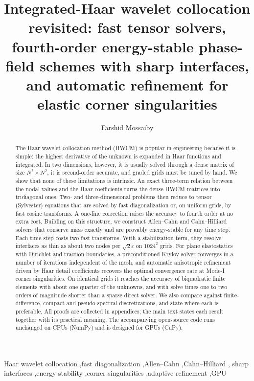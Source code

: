 \documentclass[preprint,12pt]{elsarticle}
\theoremstyle{remark}
\begin{document}
\begin{frontmatter}
\title{Integrated-Haar wavelet collocation revisited: fast tensor solvers, fourth-order
energy-stable phase-field schemes with sharp interfaces, and automatic refinement for elastic corner singularities}

\author[inst1]{Farshid Mossaiby}

\begin{abstract}
The Haar wavelet collocation method (HWCM) is popular in engineering because it is simple: the
highest derivative of the unknown is expanded in Haar functions and integrated. In two dimensions,
however, it is usually solved through a dense matrix of size $N^2\times N^2$, it is second-order
accurate, and graded grids must be tuned by hand. We show that none of these limitations is
intrinsic. An exact three-term relation between the nodal values and the Haar coefficients turns
the dense HWCM matrices into tridiagonal ones. Two- and three-dimensional problems then reduce to
tensor (Sylvester) equations that are solved by fast diagonalization or, on uniform grids, by fast
cosine transforms. A one-line correction raises the accuracy to fourth order at no extra cost.
Building on this structure, we construct Allen--Cahn and Cahn--Hilliard solvers that conserve mass
exactly and are provably energy-stable for any time step. Each time step costs two fast transforms.
With a stabilization term, they resolve interfaces as thin as about two nodes per
$\sqrt2\varepsilon$ on $1024^2$ grids. For plane elastostatics with Dirichlet and traction
boundaries, a preconditioned Krylov solver converges in a number of iterations independent of the
mesh, and automatic anisotropic refinement driven by Haar detail coefficients recovers the optimal
convergence rate at Mode-I corner singularities. On identical grids it reaches the accuracy of
biquadratic finite elements with about one quarter of the unknowns, and with solve times one to two
orders of magnitude shorter than a sparse direct solver. We also compare against finite-difference,
compact and pseudo-spectral discretizations, and state where each is preferable. All proofs are
collected in appendices; the main text
states each result together with its practical meaning. The accompanying open-source code runs
unchanged on CPUs (NumPy) and is designed for GPUs (CuPy).
\end{abstract}

\begin{keyword}
Haar wavelet collocation \sep fast diagonalization \sep Allen--Cahn \sep Cahn--Hilliard \sep
sharp interfaces \sep energy stability \sep corner singularities \sep adaptive refinement \sep GPU
\end{keyword}
\end{frontmatter}
\end{document}
